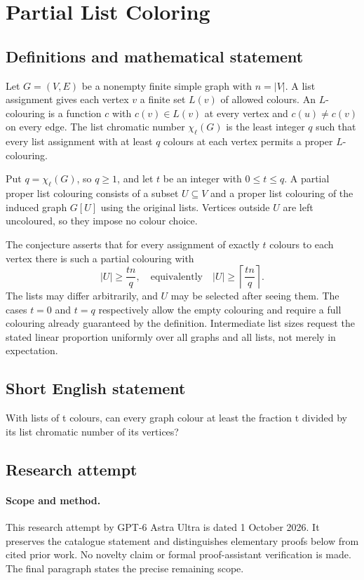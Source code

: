 \documentclass[11pt,a4paper]{article}
\begin{document}
\section*{Partial List Coloring}\label{statement}

\subsection{Definitions and mathematical statement}
Let $G=(V,E)$ be a nonempty
finite simple graph with
$n=|V|$. A list assignment
gives each vertex $v$ a
finite set $L(v)$ of allowed
colours. An $L$-colouring
is a function $c$ with
$c(v)\in L(v)$ at every
vertex and $c(u)\neq c(v)$
on every edge. The list
chromatic number $\chi_\ell(G)$
is the least integer $q$
such that every list assignment
with at least $q$ colours
at each vertex permits a
proper $L$-colouring.

Put $q=\chi_\ell(G)$, so
$q\geq1$, and let $t$
be an integer with
$0\leq t\leq q$. A partial
proper list colouring consists
of a subset $U\subseteq V$
and a proper list colouring
of the induced graph $G[U]$
using the original lists.
Vertices outside $U$ are
left uncoloured, so they
impose no colour choice.

The conjecture asserts that
for every assignment of
exactly $t$ colours to each
vertex there is such a
partial colouring with
\[
 |U|\geq\frac{tn}{q},
 \quad\text{equivalently}\quad
 |U|\geq\left\lceil\frac{tn}{q}\right\rceil.
\]
The lists may differ arbitrarily,
and $U$ may be selected
after seeing them. The cases
$t=0$ and $t=q$ respectively
allow the empty colouring
and require a full colouring
already guaranteed by the
definition. Intermediate list
sizes request the stated
linear proportion uniformly
over all graphs and all
lists, not merely in
expectation.
\subsection{Short English statement}
With lists of t colours, can every graph colour at least the fraction t divided by its list chromatic number of its vertices?
\subsection{Research attempt}
\paragraph{Scope and method.}
This research attempt by GPT-6 Astra Ultra is dated 1 October 2026.
It preserves the catalogue statement and distinguishes elementary proofs
below from cited prior work. No novelty claim or formal proof-assistant
verification is made. The final paragraph states the precise remaining scope.
\end{document}
